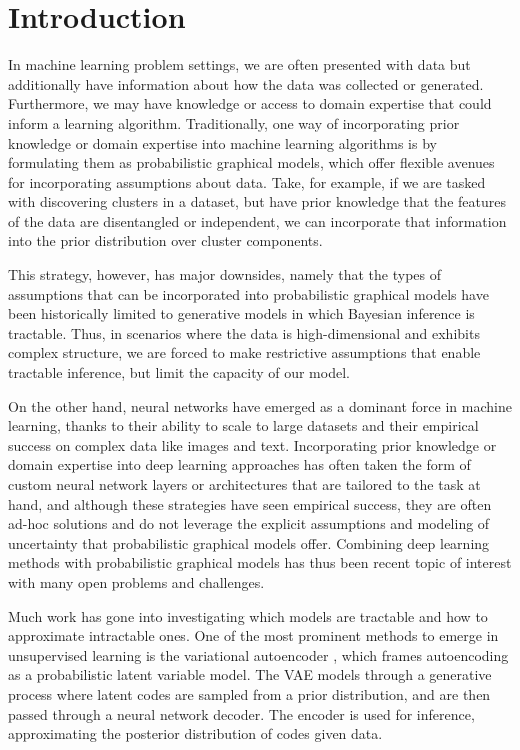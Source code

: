 \chapter{Introduction}

In machine learning problem
settings, we 
are often presented with data
but additionally have
information about how the
data was collected or generated.
Furthermore, we may have
knowledge or access
to domain expertise that 
could inform a learning algorithm.
Traditionally,
one way of incorporating
prior knowledge or domain
expertise into machine
learning algorithms
is by formulating them as probabilistic
graphical models, which
offer flexible avenues for
incorporating assumptions about data.
Take, for example, if we are
tasked with discovering
clusters in a dataset, but have
prior knowledge that
the features of the data are
disentangled or independent,
we can incorporate that
information into the
prior distribution
over cluster components.

This strategy, however,
has major downsides,
namely that the types
of assumptions that
can be incorporated
into probabilistic graphical
models have been historically
limited to generative models in which
Bayesian inference is tractable.
Thus, in scenarios where
the data is high-dimensional
and exhibits complex structure,
we are forced to make
restrictive assumptions
that enable tractable inference,
but limit the capacity
of our model.

On the other hand,
neural networks have emerged
as a dominant force
in machine learning,
thanks to their
ability to scale to large datasets
and their empirical success on complex
data like images and text.
Incorporating prior knowledge
or domain expertise into
deep learning approaches
has often taken the form of
custom neural network layers or
architectures that are tailored
to the task at hand,
and although these strategies
have seen empirical success,
they are often ad-hoc
solutions and do not
leverage the explicit assumptions
and modeling of uncertainty that
probabilistic graphical models offer.
Combining deep learning
methods with probabilistic graphical
models has thus been
recent topic of interest
with many open problems
and challenges.

Much work has gone into investigating
which models are tractable
and how to approximate
intractable ones.
One of the most prominent
methods to emerge in unsupervised learning
is the variational autoencoder \citep[VAE; ][]{Kingma2014, Rezende2014},
which frames autoencoding
as a probabilistic latent variable model.
The VAE models
through a generative process
where latent codes are sampled
from a prior distribution,
and are then passed through a
neural network decoder. 
The encoder is used for inference,
approximating the posterior
distribution of codes given data.

